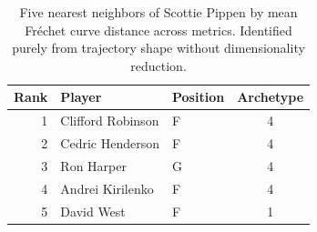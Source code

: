 \begin{table}[htbp]
  \centering\small
  \begin{tabular}{rllc}
    \toprule
    Rank & Player & Position & Archetype \\
    \midrule
    1 & Clifford Robinson & F & 4 \\
    2 & Cedric Henderson & F & 4 \\
    3 & Ron Harper & G & 4 \\
    4 & Andrei Kirilenko & F & 4 \\
    5 & David West & F & 1 \\
    \bottomrule
  \end{tabular}
  \caption{Five nearest neighbors of Scottie Pippen by mean Fr\'{e}chet curve distance across metrics. Identified purely from trajectory shape without dimensionality reduction.}
  \label{tab:Scottie_Pippen_frechet_curve_neighbors}
\end{table}

